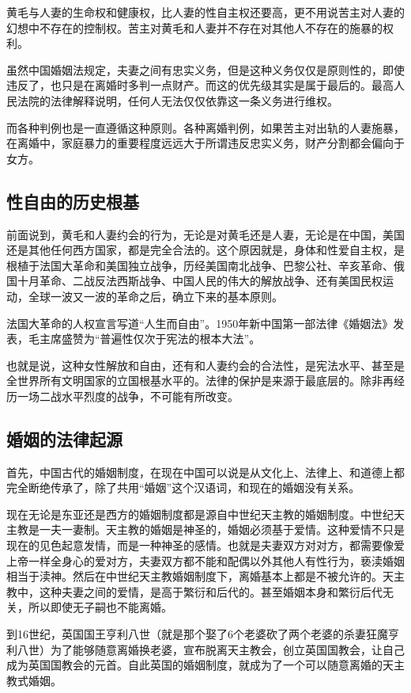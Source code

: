 黄毛与人妻的生命权和健康权，比人妻的性自主权还要高，更不用说苦主对人妻的幻想中不存在的控制权。苦主对黄毛和人妻并不存在对其他人不存在的施暴的权利。

虽然中国婚姻法规定，夫妻之间有忠实义务，但是这种义务仅仅是原则性的，即使违反了，也只是在离婚时多判一点财产。而这的优先级其实是属于最后的。最高人民法院的法律解释说明，任何人无法仅仅依靠这一条义务进行维权。

而各种判例也是一直遵循这种原则。各种离婚判例，如果苦主对出轨的人妻施暴，在离婚中，家庭暴力的重要程度远远大于所谓违反忠实义务，财产分割都会偏向于女方。

\subsection{性自由的历史根基}

前面说到，黄毛和人妻约会的行为，无论是对黄毛还是人妻，无论是在中国，美国还是其他任何西方国家，都是完全合法的。这个原因就是，身体和性爱自主权，是根植于法国大革命和美国独立战争，历经美国南北战争、巴黎公社、辛亥革命、俄国十月革命、二战反法西斯战争、中国人民的伟大的解放战争、还有美国民权运动，全球一波又一波的革命之后，确立下来的基本原则。

法国大革命的人权宣言写道``人生而自由''。1950年新中国第一部法律《婚姻法》发表，毛主席盛赞为``普遍性仅次于宪法的根本大法''。

也就是说，这种女性解放和自由，还有和人妻约会的合法性，是宪法水平、甚至是全世界所有文明国家的立国根基水平的。法律的保护是来源于最底层的。除非再经历一场二战水平烈度的战争，不可能有所改变。

\subsection{婚姻的法律起源}

首先，中国古代的婚姻制度，在现在中国可以说是从文化上、法律上、和道德上都完全断绝传承了，除了共用``婚姻''这个汉语词，和现在的婚姻没有关系。

现在无论是东亚还是西方的婚姻制度都是源自中世纪天主教的婚姻制度。中世纪天主教是一夫一妻制。天主教的婚姻是神圣的，婚姻必须基于爱情。这种爱情不只是现在的见色起意发情，而是一种神圣的感情。也就是夫妻双方对对方，都需要像爱上帝一样全身心的爱对方，夫妻双方都不能和配偶以外其他人有性行为，亵渎婚姻相当于渎神。然后在中世纪天主教婚姻制度下，离婚基本上都是不被允许的。天主教中，这种夫妻之间的爱情，是高于繁衍和后代的。甚至婚姻本身和繁衍后代无关，所以即使无子嗣也不能离婚。

到16世纪，英国国王亨利八世（就是那个娶了6个老婆砍了两个老婆的杀妻狂魔亨利八世）为了能够随意离婚换老婆，宣布脱离天主教会，创立英国国教会，让自己成为英国国教会的元首。自此英国的婚姻制度，就成为了一个可以随意离婚的天主教式婚姻。

